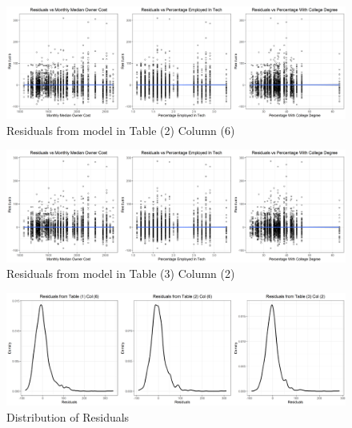 \documentclass{article}
\begin{document}
	\begin{figure}[h]
	\caption{Residuals from model in Table (2) Column (6)}
	\centering
	\includegraphics[width=\textwidth]{residuals_check2.png}
	\end{figure}

	\begin{figure}[h]
	\caption{Residuals from model in Table (3) Column (2)}
	\centering
	\includegraphics[width=\textwidth]{residuals_check3.png}
	\end{figure}

	\begin{figure}[h]
	\caption{Distribution of Residuals}
	\centering
	\includegraphics[width=\textwidth]{residuals_distribution.png}
	\end{figure}
	
\end{document}
